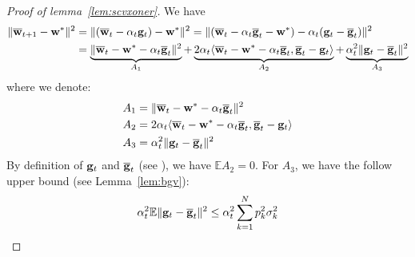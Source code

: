 \begin{proof}[Proof of lemma~\ref{lem:scvxoner}]
	We have 
	\begin{align*}
	\|{\overline{\mathbf{w}}}_{t+1}-{\mathbf{w}}^{\ast}\|^{2} & =\|({\overline{\mathbf{w}}}_{t}-\alpha_{t}{\mathbf{g}}_{t})-{\mathbf{w}}^{\ast}\|^{2} =\|({\overline{\mathbf{w}}}_{t}-\alpha_{t}{\overline{\mathbf{g}}}_{t}-{\mathbf{w}}^{\ast})-\alpha_{t}({\mathbf{g}}_{t}-{\overline{\mathbf{g}}}_{t})\|^{2}\\
	& = \underbrace{\|{\overline{\mathbf{w}}}_{t}-{\mathbf{w}}^{\ast}-\alpha_{t}{\overline{\mathbf{g}}}_{t}\|^{2}}_{A_1} + \underbrace{2\alpha_{t}\langle{\overline{\mathbf{w}}}_{t}-{\mathbf{w}}^{\ast}-\alpha_{t}{\overline{\mathbf{g}}}_{t},{\overline{\mathbf{g}}}_{t}-{\mathbf{g}}_{t}\rangle}_{A_2} + \underbrace{\alpha_{t}^{2}\|{\mathbf{g}}_{t}-{\overline{\mathbf{g}}}_{t}\|^{2}}_{A_3}
	\end{align*}
	where we denote: 
	\begin{align*}
	A_{1} & =\|{\overline{\mathbf{w}}}_{t}-{\mathbf{w}}^{\ast}-\alpha_{t}{\overline{\mathbf{g}}}_{t}\|^{2}\\
	A_{2} & =2\alpha_{t}\langle{\overline{\mathbf{w}}}_{t}-{\mathbf{w}}^{\ast}-\alpha_{t}{\overline{\mathbf{g}}}_{t},{\overline{\mathbf{g}}}_{t}-{\mathbf{g}}_{t}\rangle\\
	A_{3} & =\alpha_{t}^{2}\|{\mathbf{g}}_{t}-{\overline{\mathbf{g}}}_{t}\|^{2}
	\end{align*}
	By definition of ${\mathbf{g}}_{t}$ and ${\overline{\mathbf{g}}}_{t}$ (see \eq{\ref{eq:gradient}}), we have $\mathbb{E}A_{2}=0$.
	For $A_{3}$, we have the follow upper bound (see Lemma~\ref{lem:bgv}):
	\begin{align*}
	\alpha_{t}^{2}\mathbb{E}\|{\mathbf{g}}_{t}-{\overline{\mathbf{g}}}_{t}\|^{2} \leq\alpha_{t}^{2}\sum_{k=1}^{N}p_{k}^{2}\sigma_{k}^{2}
	\end{align*} 
	

\end{proof}
